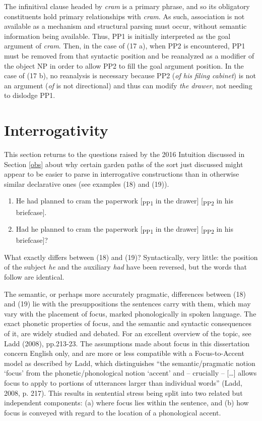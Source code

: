 \documentclass[11pt,oneside]{book}
\providecommand{\tightlist}{%
  \setlength{\itemsep}{0pt}\setlength{\parskip}{0pt}}
\begin{document}
The infinitival clause headed by \emph{cram} is a primary phrase, and so its obligatory constituents hold primary relationships with \emph{cram}. As such, association is not available as a mechanism and structural parsing must occur, without semantic information being available. Thus, PP1 is initially interpreted as the goal argument of \emph{cram}. Then, in the case of (17 a), when PP2 is encountered, PP1 must be removed from that syntactic position and be reanalyzed as a modifier of the object NP in order to allow PP2 to fill the goal argument position. In the case of (17 b), no reanalysis is necessary because PP2 (\emph{of his filing cabinet}) is not an argument (\emph{of} is not directional) and thus can modify \emph{the drawer}, not needing to dislodge PP1.

\hypertarget{intg}{%
\section{Interrogativity}\label{intg}}

This section returns to the questions raised by the 2016 Intuition discussed in Section \ref{obs} about why certain garden paths of the sort just discussed might appear to be easier to parse in interrogative constructions than in otherwise similar declarative ones (see examples (18) and (19)).

\begin{enumerate}
\def\labelenumi{(\arabic{enumi})}
\setcounter{enumi}{17}
\tightlist
\item
  He had planned to cram the paperwork {[}\textsubscript{PP1} in the drawer{]} {[}\textsubscript{PP2} in his briefcase{]}.
\item
  Had he planned to cram the paperwork {[}\textsubscript{PP1} in the drawer{]} {[}\textsubscript{PP2} in his briefcase{]}?
\end{enumerate}

What exactly differs between (18) and (19)? Syntactically, very little: the position of the subject \emph{he} and the auxiliary \emph{had} have been reversed, but the words that follow are identical.

The semantic, or perhaps more accurately pragmatic, differences between (18) and (19) lie with the presuppositions the sentences carry with them, which may vary with the placement of focus, marked phonologically in spoken language. The exact phonetic properties of focus, and the semantic and syntactic consequences of it, are widely studied and debated. For an excellent overview of the topic, see Ladd (2008), pp.213-23. The assumptions made about focus in this dissertation concern English only, and are more or less compatible with a Focus-to-Accent model as described by Ladd, which distinguishes ``the semantic/pragmatic notion `focus' from the phonetic/phonological notion `accent' and -- crucially -- {[}\ldots{]} allows focus to apply to portions of utterances larger than individual words'' (Ladd, 2008, p. 217). This results in sentential stress being split into two related but independent components: (a) where focus lies within the sentence, and (b) how focus is conveyed with regard to the location of a phonological accent.
\end{document}
